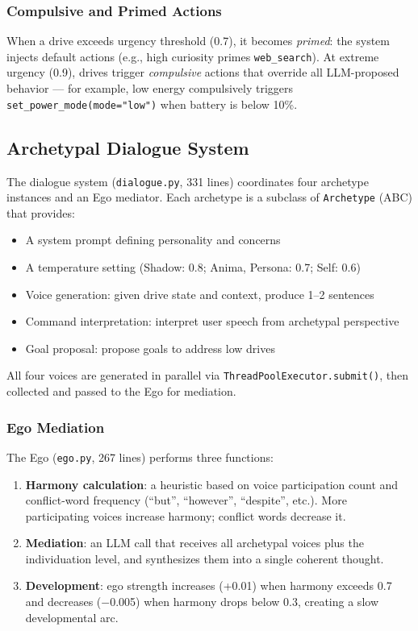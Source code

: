 \documentclass[11pt,oneside]{article}
\begin{document}
\subsubsection{Compulsive and Primed Actions}

When a drive exceeds urgency threshold (0.7), it becomes \emph{primed}: the system injects default actions (e.g., high curiosity primes \texttt{web\_search}).
At extreme urgency (0.9), drives trigger \emph{compulsive} actions that override all LLM-proposed behavior --- for example, low energy compulsively triggers \texttt{set\_power\_mode(mode="low")} when battery is below 10\%.

\subsection{Archetypal Dialogue System}

The dialogue system (\texttt{dialogue.py}, 331 lines) coordinates four archetype instances and an Ego mediator.
Each archetype is a subclass of \texttt{Archetype} (ABC) that provides:

\begin{itemize}
  \item A system prompt defining personality and concerns
  \item A temperature setting (Shadow: 0.8; Anima, Persona: 0.7; Self: 0.6)
  \item Voice generation: given drive state and context, produce 1--2 sentences
  \item Command interpretation: interpret user speech from archetypal perspective
  \item Goal proposal: propose goals to address low drives
\end{itemize}

All four voices are generated in parallel via \texttt{ThreadPoolExecutor.submit()}, then collected and passed to the Ego for mediation.

\subsubsection{Ego Mediation}

The Ego (\texttt{ego.py}, 267 lines) performs three functions:

\begin{enumerate}
  \item \textbf{Harmony calculation}: a heuristic based on voice participation count and conflict-word frequency (``but'', ``however'', ``despite'', etc.).
        More participating voices increase harmony; conflict words decrease it.
  \item \textbf{Mediation}: an LLM call that receives all archetypal voices plus the individuation level, and synthesizes them into a single coherent thought.
  \item \textbf{Development}: ego strength increases (+0.01) when harmony exceeds 0.7 and decreases ($-$0.005) when harmony drops below 0.3, creating a slow developmental arc.
\end{enumerate}
\end{document}
